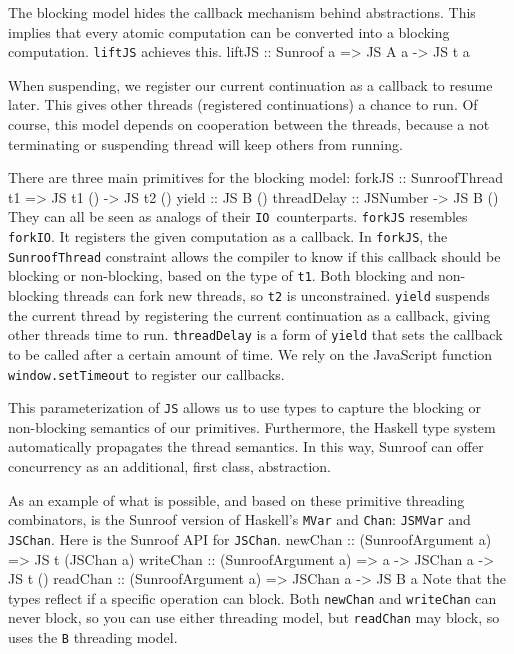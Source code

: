 \documentclass{llncs}
\newcommand{\Src}[1]{{\tt{#1}}}
\newcommand{\IO}{\Src{IO}}
\newenvironment{Code}{\verbatim}{\endverbatim}
\begin{document}
The blocking model hides the callback mechanism behind abstractions.
This implies that every atomic computation can be converted into 
a blocking computation. \Src{liftJS} achieves this.
\begin{Code}
liftJS :: Sunroof a => JS A a -> JS t a
\end{Code}

When suspending, we register our current
continuation as a callback to resume later. This gives other 
threads (registered continuations) a chance to run.
Of course, this model depends on cooperation between the threads,
because a not terminating or suspending thread will keep others from running.

There are three main primitives for the blocking model:
\begin{Code}
forkJS      :: SunroofThread t1 => JS t1 () -> JS t2 ()
yield       :: JS B ()
threadDelay :: JSNumber -> JS B ()
\end{Code}
They can all be seen as analogs of their \IO~counterparts.
\Src{forkJS} resembles \Src{forkIO}.
It registers the given computation as a callback. 
In \Src{forkJS}, the \Src{SunroofThread} constraint allows the compiler
to know if this callback should be blocking or non-blocking,
based on the type of \Src{t1}. Both blocking and non-blocking
threads can fork new threads, so \Src{t2} is unconstrained.
\Src{yield} suspends the current thread by 
registering the current continuation as a callback,
giving other threads time to run.
\Src{threadDelay} is a form of \Src{yield} that sets 
the callback to be called after a certain amount of time.
We rely on the JavaScript function \Src{window.setTimeout} 
\cite{whatwg:timers} to register our callbacks.

This parameterization of \Src{JS} allows us to use types to capture
the blocking or non-blocking semantics of our primitives.
Furthermore, the Haskell type system automatically propagates
the thread semantics. In this way, Sunroof can offer concurrency
as an additional, first class, abstraction.

As an example of what is possible, and based on these primitive
threading combinators, is the Sunroof
version of Haskell's \Src{MVar} and \Src{Chan}: \Src{JSMVar} and \Src{JSChan}.
Here is the Sunroof API for \Src{JSChan}.
\begin{Code}
newChan   :: (SunroofArgument a) => JS t (JSChan a)
writeChan :: (SunroofArgument a) => a -> JSChan a -> JS t ()
readChan  :: (SunroofArgument a) => JSChan a -> JS B a
\end{Code}
Note that the types reflect if a specific operation can block.
Both \Src{newChan} and \Src{writeChan} can never block, so you can use either threading model,
but \Src{readChan} may block, so uses the \Src{B} threading model.
\end{document}
